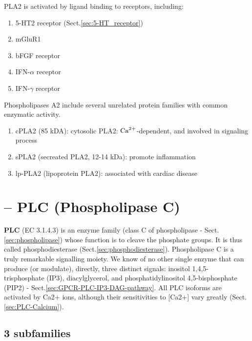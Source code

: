 PLA2 is activated by ligand binding to receptors, including:
\begin{enumerate}
  \item 5-HT2 receptor (Sect.\ref{sec:5-HT_receptor})
  
  \item mGluR1
  
  \item bFGF receptor
  
  \item IFN-$\alpha$ receptor
  
  \item IFN-$\gamma$ receptor 
\end{enumerate}

Phospholipases A2 include several unrelated protein families with common
enzymatic activity.
\begin{enumerate}
  
  \item cPLA2 (85 kDA): cytosolic PLA2: ${\text{Ca}^{2+}}$-dependent, and involved in
  signaling process
  
  \item sPLA2 (secreated PLA2, 12-14 kDa): promote inflammation
  
  \item lp-PLA2 (lipoprotein PLA2): associated with cardiac disease
\end{enumerate}

\section{-- PLC (Phospholipase C)}
\label{sec:PLC}

{\bf PLC} (EC 3.1.4.3) is an enzyme family (class C of phospholipase -
Sect.\ref{sec:phospholipase}) whose function is to cleave the phosphate groups.
It is thus called phosphodiesterase (Sect.\ref{sec:phosphodiesterase}).
Phospholipase C is a truly remarkable signalling moiety. We know of no other
single enzyme that can produce (or modulate), directly, three distinct signals:
inositol 1,4,5- trisphosphate (IP3), diacylglycerol, and phosphatidylinositol
4,5-bisphosphate (PIP2) - Sect.\ref{sec:GPCR-PLC-IP3-DAG-pathway}. All PLC
isoforms are activated by Ca2+ ions, although their sensitivities to [Ca2+] vary
greatly (Sect.\ref{sec:PLC-Calcium}).


\subsection{3 subfamilies}
\label{sec:PLC-subfamilies}



